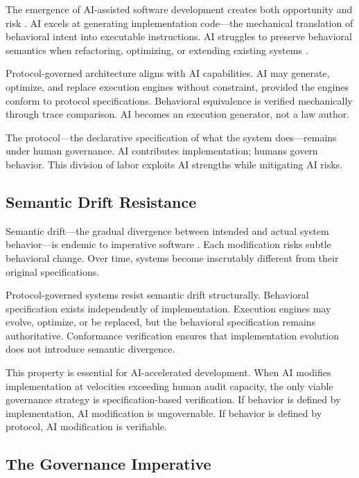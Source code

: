 \documentclass[11pt,a4paper]{article}
\begin{document}
The emergence of AI-assisted software development creates both opportunity and risk \citep{chen2021evaluating,github2023copilot}. AI excels at generating implementation code---the mechanical translation of behavioral intent into executable instructions. AI struggles to preserve behavioral semantics when refactoring, optimizing, or extending existing systems \citep{pearce2022asleep}.

Protocol-governed architecture aligns with AI capabilities. AI may generate, optimize, and replace execution engines without constraint, provided the engines conform to protocol specifications. Behavioral equivalence is verified mechanically through trace comparison. AI becomes an execution generator, not a law author.

The protocol---the declarative specification of what the system does---remains under human governance. AI contributes implementation; humans govern behavior. This division of labor exploits AI strengths while mitigating AI risks.

\subsection{Semantic Drift Resistance}

Semantic drift---the gradual divergence between intended and actual system behavior---is endemic to imperative software \citep{parnas1972criteria}. Each modification risks subtle behavioral change. Over time, systems become inscrutably different from their original specifications.

Protocol-governed systems resist semantic drift structurally. Behavioral specification exists independently of implementation. Execution engines may evolve, optimize, or be replaced, but the behavioral specification remains authoritative. Conformance verification ensures that implementation evolution does not introduce semantic divergence.

This property is essential for AI-accelerated development. When AI modifies implementation at velocities exceeding human audit capacity, the only viable governance strategy is specification-based verification. If behavior is defined by implementation, AI modification is ungovernable. If behavior is defined by protocol, AI modification is verifiable.

\subsection{The Governance Imperative}
\end{document}
